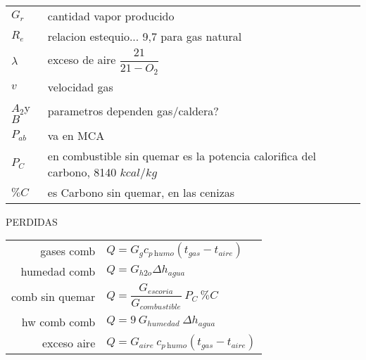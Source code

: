\documentclass[11pt,a4paper]{article}
\begin{document}
	\begin{cajita}
		\renewcommand{\arraystretch}{1.25}
		\begin{multicols}{2}
			\begin{tabular}{@{}p{1cm}@{}@{}p{7cm}@{}}
				$G_{r}$ & cantidad vapor producido\\
	
				$R_{e}$&relacion estequio... 9,7 para gas natural\\
				$\lambda$&exceso de aire $\dfrac{21}{21-O_{2}}$\\
				$v$ & velocidad gas\\
				$A_{2}$y$B$& parametros dependen gas/caldera?\\
				$P_{ab}$ & va en MCA\\
				$P_C$& en combustible sin quemar es la potencia calorifica del carbono, 8140 $kcal/kg$\\
				$\% C$ & es Carbono sin quemar, en las cenizas\\
			\end{tabular}
	
			\renewcommand{\arraystretch}{1.5}
	
			PERDIDAS\\
	
			\begin{tabular}{r l}
				gases comb & $Q = G_{g} c_{p~\textit{humo}} (t_{gas}-t_{aire})$\\
				humedad comb & $ Q= G_{h2o} \Delta h_{agua}$\\
				comb sin quemar & $ Q =\dfrac{G_{escoria}}{G_{combustible}}~P_{C}~\% C$\\
				hw comb comb &$ Q=9~G_{humedad} ~\Delta h_{agua}$\\
				exceso aire & $Q = G_{aire}~c_{p~\textit{humo}} (t_{gas}-t_{aire})$\\
			\end{tabular}
			
			\renewcommand{\arraystretch}{1.5}
		

\end{multicols}
\end{cajita}
\end{document}

